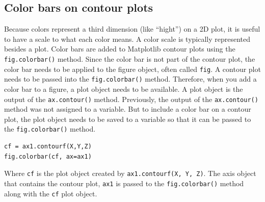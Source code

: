 \documentclass{book}
\begin{document}
    
        \subsection{Color bars on contour
plots}\label{color-bars-on-contour-plots}
    




    
        Because colors represent a third dimension (like ``hight'') on a 2D
plot, it is useful to have a scale to what each color means. A color
scale is typically represented besides a plot. Color bars are added to
Matplotlib contour plots using the \lstinline!fig.colorbar()! method.
Since the color bar is not part of the contour plot, the color bar needs
to be applied to the figure object, often called \lstinline!fig!. A
contour plot needs to be passed into the \lstinline!fig.colorbar()!
method. Therefore, when you add a color bar to a figure, a plot object
needs to be available. A plot object is the output of the
\lstinline!ax.contour()! method. Previously, the output of the
\lstinline!ax.contour()! method was not assigned to a variable. But to
include a color bar on a contour plot, the plot object needs to be saved
to a variable so that it can be passed to the \lstinline!fig.colorbar()!
method.

\begin{lstlisting}
cf = ax1.contourf(X,Y,Z)
fig.colorbar(cf, ax=ax1)
\end{lstlisting}

Where \lstinline!cf! is the plot object created by
\lstinline!ax1.contourf(X, Y, Z)!. The axis object that contains the
contour plot, \lstinline!ax1! is passed to the
\lstinline!fig.colorbar()! method along with the \lstinline!cf! plot
object.
    
\end{document}
